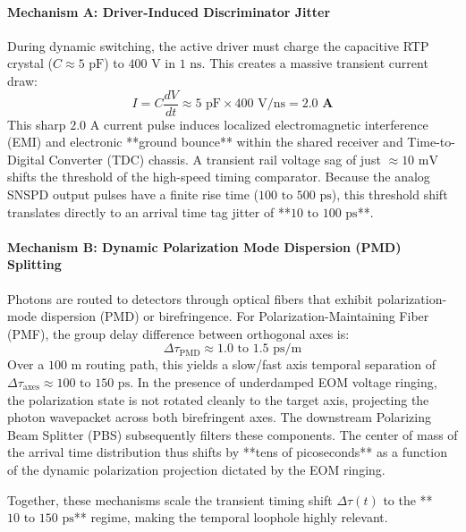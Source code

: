 \documentclass[aps,pra,reprint,superscriptaddress,amsmath,amssymb,floatfix]{revtex4-2}
\begin{document}
\paragraph{Mechanism A: Driver-Induced Discriminator Jitter}
During dynamic switching, the active driver must charge the capacitive RTP crystal ($C \approx 5\text{ pF}$) to $400\text{ V}$ in $1\text{ ns}$. This creates a massive transient current draw:
\begin{equation}
I = C \frac{dV}{dt} \approx 5\text{ pF} \times 400\text{ V/ns} = \mathbf{2.0\text{ A}}
\end{equation}
This sharp $2.0\text{ A}$ current pulse induces localized electromagnetic interference (EMI) and electronic **ground bounce** within the shared receiver and Time-to-Digital Converter (TDC) chassis. A transient rail voltage sag of just $\approx 10\text{ mV}$ shifts the threshold of the high-speed timing comparator. Because the analog SNSPD output pulses have a finite rise time ($100\text{ to }500\text{ ps}$), this threshold shift translates directly to an arrival time tag jitter of **$10\text{ to }100\text{ ps}$**.

\paragraph{Mechanism B: Dynamic Polarization Mode Dispersion (PMD) Splitting}
Photons are routed to detectors through optical fibers that exhibit polarization-mode dispersion (PMD) or birefringence. For Polarization-Maintaining Fiber (PMF), the group delay difference between orthogonal axes is:
\begin{equation}
\Delta \tau_{\text{PMD}} \approx 1.0\text{ to }1.5\text{ ps/m}
\end{equation}
Over a $100\text{ m}$ routing path, this yields a slow/fast axis temporal separation of $\Delta \tau_{\text{axes}} \approx 100\text{ to }150\text{ ps}$. In the presence of underdamped EOM voltage ringing, the polarization state is not rotated cleanly to the target axis, projecting the photon wavepacket across both birefringent axes. The downstream Polarizing Beam Splitter (PBS) subsequently filters these components. The center of mass of the arrival time distribution thus shifts by **tens of picoseconds** as a function of the dynamic polarization projection dictated by the EOM ringing.

Together, these mechanisms scale the transient timing shift $\Delta \tau(t)$ to the **$10\text{ to }150\text{ ps}$** regime, making the temporal loophole highly relevant.
\end{document}
